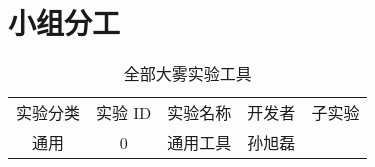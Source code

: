 \section{小组分工}

\begin{table*}[t]
  \caption{全部大雾实验工具}
  \label{tab:func}
  \vskip 0.1in
  \centering\small
  \begin{tabular}{|c|c|c|c|c|}
    \hline
    实验分类 & 实验 ID & 实验名称 & 开发者 & 子实验 \\
    \hhline{|=|=|=|=|=|}
    通用 & 0 & 通用工具 & 孙旭磊 &\\
    \hline
  \end{tabular}
  \vskip -0.1in
\end{table*}